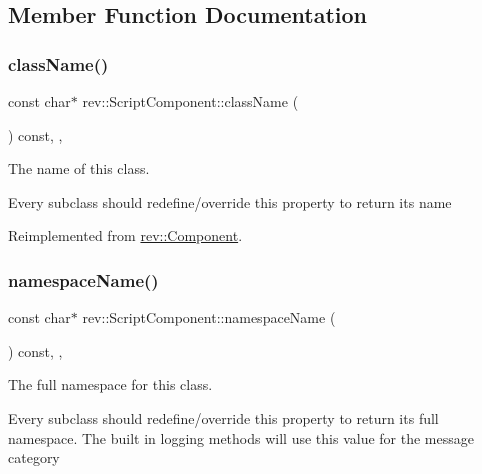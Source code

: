 \subsection{Member Function Documentation}
\mbox{\label{classrev_1_1_script_component_a2665164dc38caad07e5759aec4563dee}} 
\subsubsection{\texorpdfstring{className()}{className()}}
{\footnotesize\ttfamily const char$\ast$ rev\+::\+Script\+Component\+::class\+Name (\begin{DoxyParamCaption}{ }\end{DoxyParamCaption}) const\hspace{0.3cm}{\ttfamily [inline]}, {\ttfamily [override]}, {\ttfamily [virtual]}}



The name of this class. 

Every subclass should redefine/override this property to return its name 

Reimplemented from \mbox{\hyperlink{classrev_1_1_component_a07619152d5acafe7a536df3a6a476349}{rev\+::\+Component}}.

\mbox{\label{classrev_1_1_script_component_a469f8cd22b928cef2b98297b3b0285dd}} 
\subsubsection{\texorpdfstring{namespaceName()}{namespaceName()}}
{\footnotesize\ttfamily const char$\ast$ rev\+::\+Script\+Component\+::namespace\+Name (\begin{DoxyParamCaption}{ }\end{DoxyParamCaption}) const\hspace{0.3cm}{\ttfamily [inline]}, {\ttfamily [override]}, {\ttfamily [virtual]}}



The full namespace for this class. 

Every subclass should redefine/override this property to return its full namespace. The built in logging methods will use this value for the message category 

